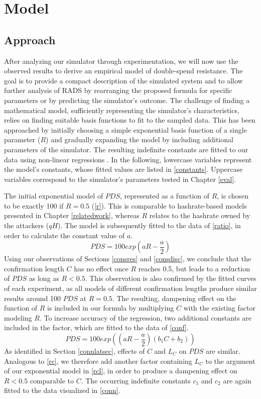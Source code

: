 \documentclass[a4paper,12pt,twoside]{report}
\begin{document}

\chapter{Model}
\section{Approach}
After analyzing our simulator through experimentation, we will now use the observed results to derive an empirical model of double-spend resistance. The goal is to provide a compact description of the simulated system and to allow further analysis of RADS by rearranging the proposed formula for specific parameters or by predicting the simulator's outcome. The challenge of finding a mathematical model, sufficiently representing the simulator's characteristics, relies on finding suitable basis functions to fit to the sampled data. This has been approached by initially choosing a simple exponential basis function of a single parameter ($R$) and gradually expanding the model by including additional parameters of the simulator.  The resulting indefinite constants are fitted to our data using non-linear regressions \cite{nlxb}. In the following, lowercase variables represent the model's constants, whose fitted values are listed in \autoref{constants}. Uppercase variables correspond to the simulator's parameters tested in Chapter \ref{eval}. 

The initial exponential model of $PDS$, represented as a function of $R$, is chosen to be exactly 100 if $R = 0.5$ (\autoref{r}). This is comparable to hashrate-based models presented in Chapter \ref{relatedwork}, whereas $R$ relates to the hashrate owned by the attackers ($qH$).  The model is subsequently fitted to the data of \autoref{ratio}, in order to calculate the constant value of $a$.
\begin{equation}\label{r}
PDS = 100 exp \left(a R- \frac{a}{2} \right)
\end{equation}
Using our observations of Sections \ref{consres} and \ref{consdisc}, we conclude that the confirmation length $C$ has no effect once $R$ reaches 0.5, but leads to a reduction of $PDS$ as long as $R < 0.5$. This observation is also confirmed by the fitted curves of each experiment, as all models of different confirmation lengths produce similar results around 100 $PDS$ at $R = 0.5$. The resulting, dampening effect on the function of $R$ is included in our formula by multiplying $C$ with the existing factor modeling $R$. To increase accuracy of the regression, two additional constants are included in the factor, which are fitted to the data of \autoref{conf}.
\begin{equation}\label{rc}
PDS = 100 exp \left( \left( a R- \frac{a}{2} \right) \left( b_1C+b_2 \right) \right)
\end{equation}
As identified in Section \ref{connlatsec}, effects of $C$ and $L_C$ on $PDS$ are similar. Analogous to \autoref{rc}, we therefore add another factor containing $L_C$ to the argument of our exponential model in \autoref{rcl}, in order to produce a dampening effect on $R < 0.5$ comparable to $C$. The occurring indefinite constants $c_1$ and $c_2$ are again fitted to the data visualized in \autoref{conn}. 
\end{document}

